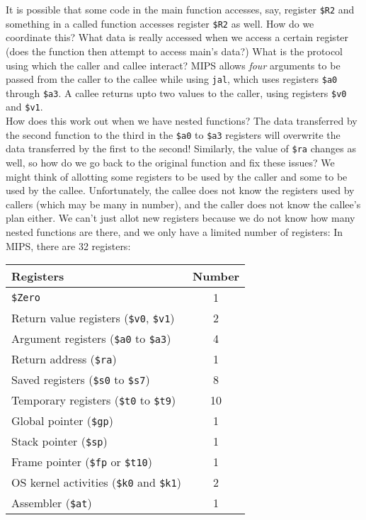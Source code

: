 \documentclass{article}
\begin{document}
		It is possible that some code in the main function accesses, say, register \texttt{\$R2} and something in a called function accesses register \texttt{\$R2} as well. How do we coordinate this? What data is really accessed when we access a certain register (does the function then attempt to access main's data?) What is the protocol using which the caller and callee interact? MIPS allows \emph{four} arguments to be passed from the caller to the callee while using \texttt{jal}, which uses registers \texttt{\$a0} through \texttt{\$a3}. A callee returns upto two values to the caller, using registers \texttt{\$v0} and \texttt{\$v1}.\\
		How does this work out when we have nested functions? The data transferred by the second function to the third in the \texttt{\$a0} to \texttt{\$a3} registers will overwrite the data transferred by the first to the second! Similarly, the value of \texttt{\$ra} changes as well, so how do we go back to the original function and fix these issues? We might think of allotting some registers to be used by the caller and some to be used by the callee. Unfortunately, the callee does not know the registers used by callers (which may be many in number), and the caller does not know the callee's plan either. We can't just allot new registers because we do not know how many nested functions are there, and we only have a limited number of registers: 
		In MIPS, there are 32 registers:
		\begin{center}
		\begin{tabular}{|l|c|}
			Registers & Number \\ \hline
			\texttt{\$Zero} & 1 \\
			Return value registers (\texttt{\$v0}, \texttt{\$v1}) & 2 \\
			Argument registers (\texttt{\$a0} to \texttt{\$a3}) & 4 \\
			Return address (\texttt{\$ra}) & 1 \\
			Saved registers (\texttt{\$s0} to \texttt{\$s7}) & 8 \\
			Temporary registers (\texttt{\$t0} to \texttt{\$t9}) & 10 \\
			Global pointer (\texttt{\$gp}) & 1 \\
			Stack pointer (\texttt{\$sp}) & 1 \\
			Frame pointer (\texttt{\$fp} or \texttt{\$t10}) & 1 \\
			OS kernel activities (\texttt{\$k0} and \texttt{\$k1}) & 2 \\
			Assembler (\texttt{\$at}) & 1
		\end{tabular}
		\end{center}
\end{document}
